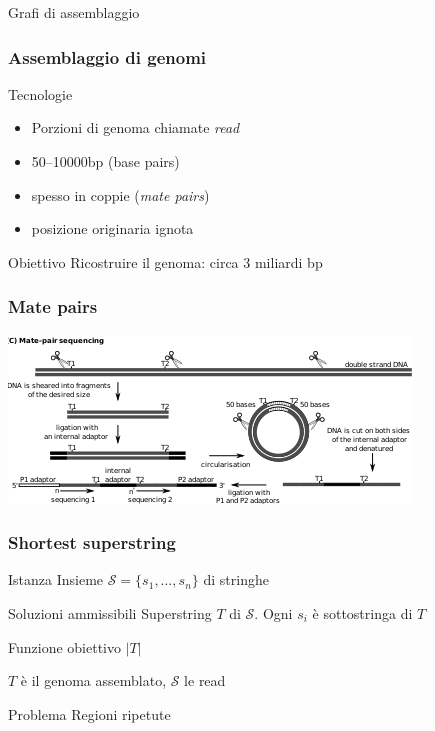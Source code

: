 \begin{frame}
      \titlepage

        \centering
          Grafi di assemblaggio
\end{frame}


\begin{frame}[fragile]
\frametitle{Assemblaggio di genomi}
\begin{block}{Tecnologie}
\begin{itemize}
\item
Porzioni di genoma chiamate \emph{read}
\item
50--10000bp (base pairs)
\item
spesso in coppie (\emph{mate pairs})
\item
posizione originaria ignota
\end{itemize}
\end{block}

\begin{block}{Obiettivo}
Ricostruire il genoma: circa 3 miliardi bp
\end{block}
\end{frame}

\begin{frame}[fragile]
\frametitle{Mate pairs}
\includegraphics[width=\textwidth]{figures/mate-pairs-solid}
\end{frame}

\begin{frame}[fragile]
\frametitle{Shortest superstring}
\begin{block}{Istanza}
Insieme $\mathcal{S} = \{s_{1}, \ldots , s_{n}\}$ di stringhe
\end{block}
\begin{block}{Soluzioni ammissibili}
Superstring $T$ di $\mathcal{S}$.
Ogni $s_{i}$ è sottostringa di $T$
\end{block}

\begin{block}{Funzione obiettivo}
$|T|$
\end{block}

$T$ è il genoma assemblato, $\mathcal{S}$ le read

\begin{block}{Problema}
Regioni ripetute
\end{block}
\end{frame}

